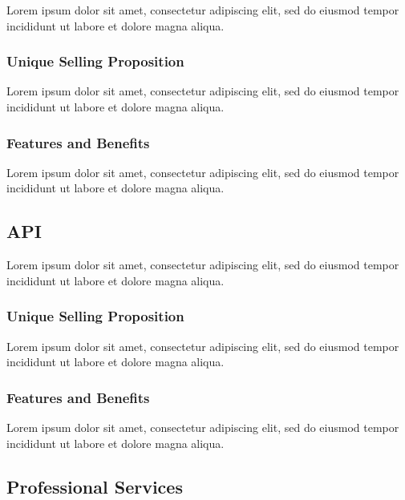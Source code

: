 Lorem ipsum dolor sit amet, consectetur adipiscing elit, sed do eiusmod tempor incididunt ut labore et dolore magna aliqua.

\subsubsection*{Unique Selling Proposition}

Lorem ipsum dolor sit amet, consectetur adipiscing elit, sed do eiusmod tempor incididunt ut labore et dolore magna aliqua.

\subsubsection*{Features and Benefits}

Lorem ipsum dolor sit amet, consectetur adipiscing elit, sed do eiusmod tempor incididunt ut labore et dolore magna aliqua.


\subsection{API}

Lorem ipsum dolor sit amet, consectetur adipiscing elit, sed do eiusmod tempor incididunt ut labore et dolore magna aliqua.

\subsubsection*{Unique Selling Proposition}

Lorem ipsum dolor sit amet, consectetur adipiscing elit, sed do eiusmod tempor incididunt ut labore et dolore magna aliqua.

\subsubsection*{Features and Benefits}

Lorem ipsum dolor sit amet, consectetur adipiscing elit, sed do eiusmod tempor incididunt ut labore et dolore magna aliqua.


\subsection{Professional Services}

